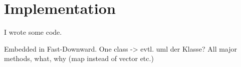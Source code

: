 \chapter{Implementation}\label{ch:implementation}
I wrote some code.

Embedded in Fast-Downward.
One class -> evtl. uml der Klasse?
All major methods, what, why (map instead of vector etc.)